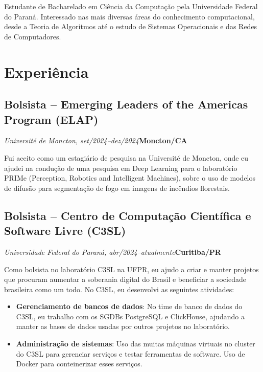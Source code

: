 \documentclass[a4paper, 12pt]{moderncv}
\begin{document}
\makecvtitle

\small{Estudante de Bacharelado em Ciência da Computação pela Universidade
Federal do Paraná. Interessado nas mais diversas áreas do conhecimento
computacional, desde a Teoria de Algoritmos até o estudo de Sistemas
Operacionais e das Redes de Computadores.}

\section{Experiência}
\vspace{1pt}
\subsection{\small{Bolsista -- Emerging Leaders of the Americas Program (ELAP)}}
\textit{Université de Moncton, set/2024--dez/2024}\hspace{190pt}\textbf{Moncton/CA}

\vspace{3pt}
Fui aceito como um estagiário de pesquisa na Université de Moncton, onde eu
ajudei na condução de uma pesquisa em Deep Learning para o laboratório PRIMe
(Perception, Robotics and Intelligent Machines), sobre o uso de modelos de
difusão para segmentação de fogo em imagens de incêndios florestais.
\vspace{4pt}

\subsection{\small{Bolsista -- Centro de Computação Científica e Software Livre (C3SL)}}
\textit{Universidade Federal do Paraná, abr/2024--atualmente}\hspace{150pt}\textbf{Curitiba/PR}

\vspace{3pt}
Como bolsista no laboratório C3SL na UFPR, eu ajudo a criar e manter projetos
que procuram aumentar a soberania digital do Brasil e beneficiar a sociedade
brasileira como um todo. No C3SL, eu desenvolvi as seguintes atividades:
\vspace{4pt}
\begin{itemize}
    \item{\textbf{Gerenciamento de bancos de dados}: No time de banco de dados
        do C3SL, eu trabalho com os SGDBs PostgreSQL e ClickHouse, ajudando a
    manter as bases de dados usadas por outros projetos no laboratório.}
\item{\textbf{Administração de sistemas}: Uso das muitas máquinas virtuais no
    cluster do C3SL para gerenciar serviços e testar ferramentas de software.
    Uso de Docker para conteinerizar esses serviços.}
\end{itemize}
\end{document}
